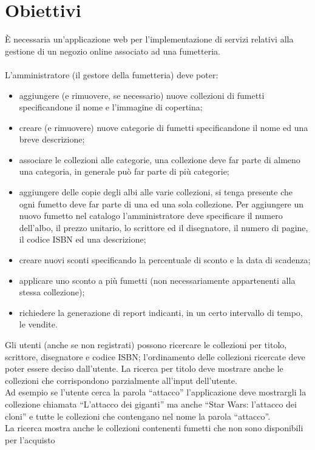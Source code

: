 \documentclass{scrreprt}
\begin{document}
\section{Obiettivi}\label{obiettivi}
È necessaria un’applicazione web per l’implementazione di servizi relativi alla gestione 
di un negozio online associato ad una fumetteria.\\
\\
L'amministratore (il gestore della fumetteria) deve poter:
\begin{itemize}
    \item aggiungere (e rimuovere, se necessario) nuove collezioni di fumetti specificandone il 
    nome e l'immagine di copertina;
    \item creare (e rimuovere) nuove categorie di fumetti specificandone il nome ed una breve
    descrizione;
    \item associare le collezioni alle categorie, una collezione deve far parte di almeno una
    categoria, in generale può far parte di più categorie;
    \item aggiungere delle copie degli albi alle varie collezioni, si tenga presente che ogni
    fumetto deve far parte di una ed una sola collezione. Per aggiungere un nuovo fumetto nel 
    catalogo l'amministratore deve specificare il numero dell'albo, il prezzo unitario, lo 
    scrittore ed il disegnatore, il numero di pagine, il codice ISBN ed una descrizione;
    \item creare nuovi sconti specificando la percentuale di sconto e la data di scadenza;
    \item applicare uno sconto a più fumetti (non necessariamente appartenenti alla stessa 
    collezione);
    \item richiedere la generazione di report indicanti, in un certo intervallo di tempo, le
    vendite.
\end{itemize}
Gli utenti (anche se non registrati) possono ricercare le collezioni per titolo, scrittore,
disegnatore e codice ISBN; l'ordinamento delle collezioni ricercate deve poter essere deciso 
dall'utente. La ricerca per titolo deve mostrare anche le collezioni che corrispondono parzialmente 
all’input dell’utente.\\ 
Ad esempio se l’utente cerca la parola “attacco” l’applicazione deve mostrargli la collezione
chiamata “L’attacco dei giganti” ma anche “Star Wars: l’attacco dei cloni” e tutte le collezioni 
che contengano nel nome la parola “attacco”.\\
La ricerca mostra anche le collezioni contenenti fumetti che non sono disponibili per l'acquisto
\end{document}

